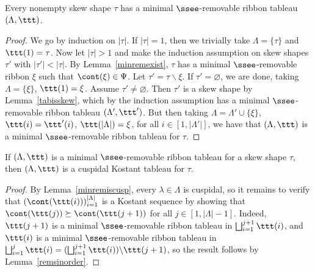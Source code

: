 \begin{lemma}\label{minremtab}
Every nonempty skew shape \(\tau\) has a minimal \(\ssee\)-removable ribbon tableau \((\Lambda,\ttt)\).
\end{lemma}
\begin{proof}
We go by induction on \(|\tau|\). If \(|\tau| = 1\), then we trivially take \(\Lambda = \{\tau\}\) and \(\ttt(1) = \tau\). Now let \(|\tau|>1\) and make the induction assumption on skew shapes \(\tau'\) with \(|\tau'| <|\tau|\).
By Lemma~\ref{minremexist}, \(\tau\) has a minimal \(\ssee\)-removable ribbon \(\xi\) such that \(\cont(\xi) \in \Psi\). Let \(\tau' = \tau \backslash \xi\). If \(\tau' = \varnothing\), we are done, taking \(\Lambda = \{\xi\}\), \(\ttt(1) = \xi\). Assume \(\tau' \neq \varnothing\). Then \(\tau'\) is a skew shape by Lemma~\ref{tabisskew}, which by the induction assumption has a minimal \(\ssee\)-removable ribbon tableau \((\Lambda', \ttt')\). But then taking \(\Lambda = \Lambda' \cup \{\xi\}\), \(\ttt(i) = \ttt'(i)\), \(\ttt(|\Lambda|) = \xi\), for all \(i \in [1,|\Lambda'|]\), we have that \((\Lambda, \ttt)\) is a minimal \(\ssee\)-removable ribbon tableau for \(\tau\).
\end{proof}

\begin{lemma}\label{minremtabisKos}
If \((\Lambda,\ttt)\) is a minimal \(\ssee\)-removable ribbon tableau for a skew shape \(\tau\), then \((\Lambda,\ttt)\) is a cuspidal Kostant tableau for \(\tau\).
\end{lemma}
\begin{proof}
By Lemma~\ref{minremiscusp}, every \(\lambda \in \Lambda\) is cuspidal, so it remains to verify that \((\cont(\ttt(i)))_{i=1}^{|\Lambda|}\) is a Kostant sequence by showing that \(\cont(\ttt(j)) \succeq \cont(\ttt(j+1))\) for all \(j \in [1,|\Lambda|-1]\). Indeed, \(\ttt(j+1)\) is a minimal \(\ssee\)-removable ribbon tableau in \(\bigsqcup_{i=1}^{j+1}\ttt(i)\), and \(\ttt(i)\) is a minimal \(\ssee\)-removable ribbon tableau in \(\bigsqcup_{i=1}^{j} \ttt(i)= (\bigsqcup_{i=1}^{j+1}\ttt(i)) \backslash \ttt(j+1)\), so the result follows by Lemma~\ref{remsinorder}.
\end{proof}

